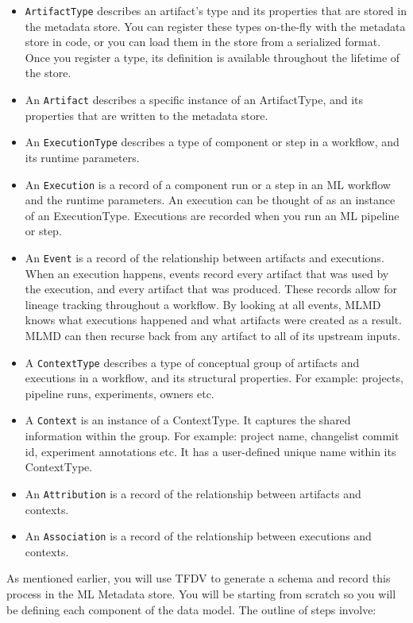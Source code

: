 \documentclass[11pt]{article}
\providecommand{\tightlist}{%
      \setlength{\itemsep}{0pt}\setlength{\parskip}{0pt}}
\begin{document}
\begin{itemize}
\tightlist
\item
  \texttt{ArtifactType} describes an artifact's type and its properties
  that are stored in the metadata store. You can register these types
  on-the-fly with the metadata store in code, or you can load them in
  the store from a serialized format. Once you register a type, its
  definition is available throughout the lifetime of the store.
\item
  An \texttt{Artifact} describes a specific instance of an ArtifactType,
  and its properties that are written to the metadata store.
\item
  An \texttt{ExecutionType} describes a type of component or step in a
  workflow, and its runtime parameters.
\item
  An \texttt{Execution} is a record of a component run or a step in an
  ML workflow and the runtime parameters. An execution can be thought of
  as an instance of an ExecutionType. Executions are recorded when you
  run an ML pipeline or step.
\item
  An \texttt{Event} is a record of the relationship between artifacts
  and executions. When an execution happens, events record every
  artifact that was used by the execution, and every artifact that was
  produced. These records allow for lineage tracking throughout a
  workflow. By looking at all events, MLMD knows what executions
  happened and what artifacts were created as a result. MLMD can then
  recurse back from any artifact to all of its upstream inputs.
\item
  A \texttt{ContextType} describes a type of conceptual group of
  artifacts and executions in a workflow, and its structural properties.
  For example: projects, pipeline runs, experiments, owners etc.
\item
  A \texttt{Context} is an instance of a ContextType. It captures the
  shared information within the group. For example: project name,
  changelist commit id, experiment annotations etc. It has a
  user-defined unique name within its ContextType.
\item
  An \texttt{Attribution} is a record of the relationship between
  artifacts and contexts.
\item
  An \texttt{Association} is a record of the relationship between
  executions and contexts.
\end{itemize}

As mentioned earlier, you will use TFDV to generate a schema and record
this process in the ML Metadata store. You will be starting from scratch
so you will be defining each component of the data model. The outline of
steps involve:
\end{document}
